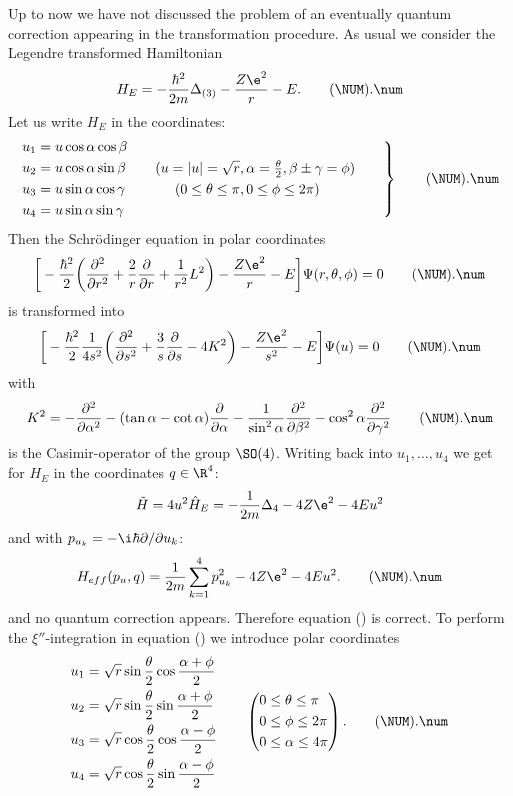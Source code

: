 Up to now we have not discussed the problem of an eventually
quantum correction appearing in the transformation procedure.
As usual we consider the Legendre transformed Hamiltonian
$$H_E=-{\hbar^2\over2m}\Delta_{(3)}-{Z\e^2\over r}-E.
  \tag\NUM.\num$$\plus%
Let us write $H_E$ in the coordinates:
$$\left.\aligned
  u_1&=u\cos\alpha\cos\beta\\
  u_2&=u\cos\alpha\sin\beta\\
  u_3&=u\sin\alpha\cos\gamma\\
  u_4&=u\sin\alpha\sin\gamma\endaligned
          \qquad
  \aligned
  (u=\vert u\vert =\sqrt{r}&,\alpha=\hbox{${\theta\over2}$},
  \beta\pm\gamma=\phi)\\
  (0\leq\theta\leq\pi&,0\leq\phi\leq2\pi)\endaligned\qquad\right\}
  \tag\NUM.\num$$\edef\numFHbw{\NUM.\num}\plus%
Then the Schr\"odinger equation in polar coordinates
$$\bigg[-{\hbar^2\over2}\bigg({\partial^2\over\partial r^2}
   +{2\over r}{\partial\over\partial r}
   +{1\over r^2}L^2\bigg)-{Z\e^2\over r}-E\bigg]\Psi(r,\theta,\phi)
   =0
  \tag\NUM.\num$$\plus%
is transformed into
$$\bigg[-{\hbar^2\over2}{1\over 4s^2}
  \bigg({\partial^2\over\partial s^2}
   +{3\over s}{\partial\over\partial s}
   -4K^2\bigg)-{Z\e^2\over s^2}-E\bigg]\Psi(u)=0
  \tag\NUM.\num$$\edef\numFHbj{\NUM.\num}\plus%
with
$$K^2=-{\partial^2\over\partial\alpha^2}
      -(\tan\alpha-\cot\alpha){\partial\over\partial\alpha}
      -{1\over\sin^2\alpha}{\partial^2\over\partial\beta^2}
      -\cos^2\alpha{\partial^2\over\partial\gamma^2}
  \tag\NUM.\num$$\plus%
is the Casimir-operator of the group $\SO(4)$.
Writing back into $u_1,\dots,u_4$
we get for $H_E$ in the coordinates $q\in\R^4$:
$$\tilde H=4u^2\hat H_E=-{1\over2m}\Delta_4-4Z\e^2-4Eu^2$$
and with $p_{u_k}=-\i\hbar\partial/\partial u_k$:
$$H_{eff}(p_u,q)={1\over2m}\sum_{k=1}^4 p_{u_
 k}^2-4Z\e^2-4Eu^2.
  \tag\NUM.\num$$\plus%
and no quantum correction appears.
Therefore equation (\numFHba) is correct.
\newline
To perform the $\xi''$-integration in equation (\numFHba) we introduce
polar coordinates
$$\aligned
  u_1&=\sqrt{r}\sin{\theta\over2}\cos{\alpha+\phi\over2}\\
  u_2&=\sqrt{r}\sin{\theta\over2}\sin{\alpha+\phi\over2}\\
  u_3&=\sqrt{r}\cos{\theta\over2}\cos{\alpha-\phi\over2}\\
  u_4&=\sqrt{r}\cos{\theta\over2}\sin{\alpha-\phi\over2}
  \endaligned\qquad\left(\aligned
  &0\leq\theta\leq\pi\\
  &0\leq\phi\leq2\pi\\
  &0\leq\alpha\leq4\pi\endaligned\right).
  \tag\NUM.\num$$\edef\numFHxa{\NUM.\num}\plus%

